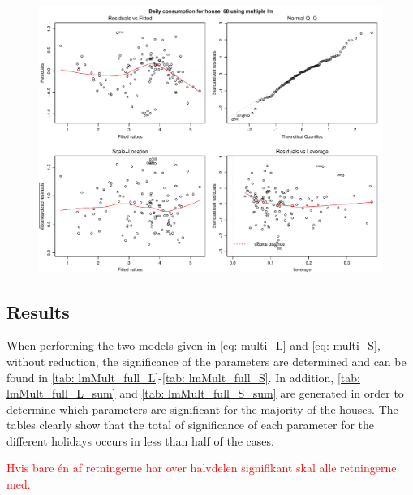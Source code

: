 \begin{figure}
    \centering
    \includegraphics[width=1.\textwidth]{../../../figures/multiple_lm68S.pdf}
    \caption{}
    \label{fig: multiple_lm68S}
\end{figure}


\subsection{Results}
\noindent When performing the two models given in \cref{eq: multi_L} and \cref{eq: multi_S}, without reduction, the significance of the parameters are determined and can be found in \cref{tab: lmMult_full_L}-\ref{tab: lmMult_full_S}. In addition, \cref{tab: lmMult_full_L_sum} and \cref{tab: lmMult_full_S_sum} are generated in order to determine which parameters are significant for the majority of the houses. The tables clearly show that the total of significance of each parameter for the different holidays occurs in less than half of the cases. 

\textcolor{red}{Hvis bare én af retningerne har over halvdelen signifikant skal alle retningerne med.}

